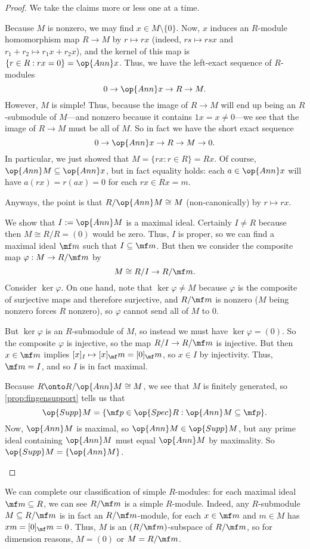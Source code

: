 \begin{proof}
	We take the claims more or less one at a time.
	\begin{listalph}
		\item Because $M$ is nonzero, we may find $x\in M\setminus\{0\}$. Now, $x$ induces an $R$-module homomorphism map $R\to M$ by $r\mapsto rx$ (indeed, $rs\mapsto rsx$ and $r_1+r_2\mapsto r_1x+r_2x$), and the kernel of this map is $\{r\in R:rx=0\}=\op{Ann}x$. Thus, we have the left-exact sequence of $R$-modules
		\[0\to\op{Ann}x\to R\to M.\]
		However, $M$ is simple! Thus, because the image of $R\to M$ will end up being an $R$-submodule of $M$---and nonzero because it contains $1x=x\ne0$---we see that the image of $R\to M$ must be all of $M$. So in fact we have the short exact sequence
		\[0\to\op{Ann}x\to R\to M\to 0.\]
		In particular, we just showed that $M=\{rx:r\in R\}=Rx$. Of course, $\op{Ann}M\subseteq\op{Ann}x$, but in fact equality holds: each $a\in\op{Ann}x$ will have $a(rx)=r(ax)=0$ for each $rx\in Rx=m$.
	
		Anyways, the point is that $R/\op{Ann}M\cong M$ (non-canonically) by $r\mapsto rx$.

		\item We show that $I:=\op{Ann}M$ is a maximal ideal. Certainly $I\ne R$ because then $M\cong R/R=(0)$ would be zero. Thus, $I$ is proper, so we can find a maximal ideal $\mf m$ such that $I\subseteq\mf m$. But then we consider the composite map $\varphi:M\to R/\mf m$ by
		\[M\cong R/I\to R/\mf m.\]
		Consider $\ker\varphi$. On one hand, note that $\ker\varphi\ne M$ because $\varphi$ is the composite of surjective maps and therefore surjective, and $R/\mf m$ is nonzero ($M$ being nonzero forces $R$ nonzero), so $\varphi$ cannot send all of $M$ to $0$.

		But $\ker\varphi$ is an $R$-submodule of $M$, so instead we must have $\ker\varphi=(0)$. So the composite $\varphi$ is injective, so the map $R/I\to R/\mf m$ is injective. But then $x\in\mf m$ implies $[x]_I\mapsto[x]_\mf m=[0]_\mf m$, so $x\in I$ by injectivity. Thus, $\mf m=I$, and so $I$ is in fact maximal.

		\item Because $R\onto R/\op{Ann}M\cong M$, we see that $M$ is finitely generated, so \autoref{prop:fingensupport} tells us that
		\[\op{Supp}M=\{\mf p\in\op{Spec}R:\op{Ann}M\subseteq\mf p\}.\]
		Now, $\op{Ann}M$ is maximal, so $\op{Ann}M\in\op{Supp}M$, but any prime ideal containing $\op{Ann}M$ must equal $\op{Ann}M$ by maximality. So $\op{Supp}M=\{\op{Ann}M\}$.
		\qedhere
	\end{listalph}
\end{proof}
\begin{remark}
	We can complete our classification of simple $R$-modules: for each maximal ideal $\mf m\subseteq R$, we can see $R/\mf m$ is a simple $R$-module. Indeed, any $R$-submodule $M\subseteq R/\mf m$ is in fact an $R/\mf m$-module, for each $x\in\mf m$ and $m\in M$ has $xm=[0]_\mf m=0$. Thus, $M$ is an $(R/\mf m)$-subspace of $R/\mf m$, so for dimension reasons, $M=(0)$ or $M=R/\mf m$.
\end{remark}

